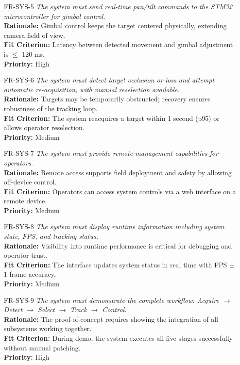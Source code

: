 \documentclass[12pt]{article}
\begin{document}
\begin{itemize}
  \item[FR-SYS-5] \emph{The system must send real-time pan/tilt commands to the STM32
          microcontroller for gimbal control.}\\[2mm]
        {\bf Rationale:} Gimbal control keeps the target centered physically, extending camera field of view.\\
        {\bf Fit Criterion:} Latency between detected movement and gimbal adjustment is $\leq$ 120 ms.\\
        {\bf Priority:} High

  \item[FR-SYS-6] \emph{The system must detect target occlusion or loss and attempt
          automatic re-acquisition, with manual reselection available.}\\[2mm]
        {\bf Rationale:} Targets may be temporarily obstructed; recovery ensures robustness of the tracking loop.\\
        {\bf Fit Criterion:} The system reacquires a target within 1 second (p95) or allows operator reselection.\\
        {\bf Priority:} Medium

  \item[FR-SYS-7] \emph{The system must provide remote management capabilities for
          operators.}\\[2mm]
        {\bf Rationale:} Remote access supports field deployment and safety by allowing off-device control.\\
        {\bf Fit Criterion:} Operators can access system controls via a web interface on a remote device.\\
        {\bf Priority:} Medium

  \item[FR-SYS-8] \emph{The system must display runtime information including system
          state, FPS, and tracking status.}\\[2mm]
        {\bf Rationale:} Visibility into runtime performance is critical for debugging and operator trust.\\
        {\bf Fit Criterion:} The interface updates system status in real time with FPS $\pm$ 1 frame accuracy.\\
        {\bf Priority:} Medium

  \item[FR-SYS-9] \emph{The system must demonstrate the complete workflow: Acquire
          $\rightarrow$ Detect $\rightarrow$ Select $\rightarrow$ Track $\rightarrow$
          Control.}\\[2mm]
        {\bf Rationale:} The proof-of-concept requires showing the integration of all subsystems working together.\\
        {\bf Fit Criterion:} During demo, the system executes all five stages successfully without manual patching.\\
        {\bf Priority:} High


\end{itemize}
\end{document}
